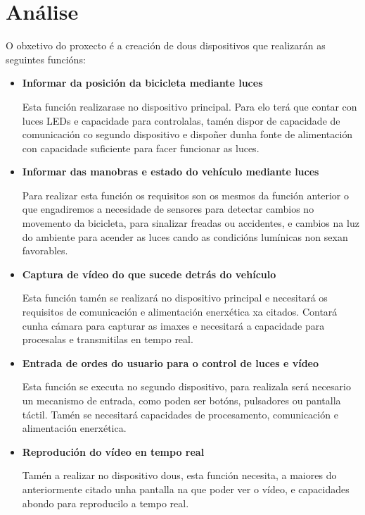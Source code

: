 \section{Análise}
O obxetivo do proxecto é a creación de dous dispositivos que realizarán as seguintes funcións:
\begin{itemize}
    \item\textbf{Informar da posición da bicicleta mediante luces}

Esta función realizarase no dispositivo principal. Para elo terá que contar con luces LEDs e capacidade para controlalas, tamén dispor de capacidade de comunicación co segundo dispositivo e dispoñer dunha fonte de alimentación con capacidade suficiente para facer funcionar as luces.\\

    \item\textbf{Informar das manobras e estado do vehículo mediante luces}

Para realizar esta función os requisitos son os mesmos da función anterior o que engadiremos a necesidade de sensores para detectar cambios no movemento da bicicleta, para sinalizar freadas ou accidentes, e cambios na luz do ambiente para acender as luces cando as condicións lumínicas non sexan favorables.\\

    \item\textbf{Captura de vídeo do que sucede detrás do vehículo}

Esta función tamén se realizará no dispositivo principal e necesitará os requisitos de comunicación e alimentación enerxética xa citados. Contará cunha cámara para capturar as imaxes e necesitará a capacidade para procesalas e transmitilas en tempo real.\\

    \item\textbf{Entrada de ordes do usuario para o control de luces e vídeo}

Esta función se executa no segundo dispositivo, para realizala será necesario un mecanismo de entrada, como poden ser botóns, pulsadores ou pantalla táctil. Tamén se necesitará capacidades de procesamento, comunicación e alimentación enerxética.\\

    \item\textbf{Reprodución do vídeo en tempo real}

Tamén a realizar no dispositivo dous, esta función necesita, a maiores do anteriormente citado unha pantalla na que poder ver o vídeo, e capacidades abondo para reproducilo a tempo real.
\end{itemize}


